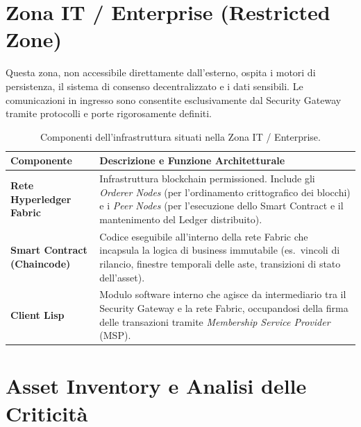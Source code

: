 \newpage

\section{Zona IT / Enterprise (Restricted Zone)}

Questa zona, non accessibile direttamente dall'esterno, ospita i motori di persistenza, il sistema di consenso decentralizzato e i dati sensibili. Le comunicazioni in ingresso sono consentite esclusivamente dal Security Gateway tramite protocolli e porte rigorosamente definiti.

\begin{table}[h]
\centering
\small
\renewcommand{\arraystretch}{1.4}
\begin{tabularx}{\textwidth}{>{\bfseries}p{3.5cm} X}
\toprule
\textbf{Componente} & \textbf{Descrizione e Funzione Architetturale} \\
\midrule
Rete Hyperledger Fabric &
    Infrastruttura blockchain permissioned. Include gli \textit{Orderer Nodes} (per l'ordinamento
    crittografico dei blocchi) e i \textit{Peer Nodes} (per l'esecuzione dello Smart Contract e
    il mantenimento del Ledger distribuito). \\[4pt]
Smart Contract (Chaincode) &
    Codice eseguibile all'interno della rete Fabric che incapsula la logica di business
    immutabile (es.\ vincoli di rilancio, finestre temporali delle aste, transizioni di stato
    dell'asset). \\[4pt]
Client Lisp &
    Modulo software interno che agisce da intermediario tra il Security Gateway e la rete
    Fabric, occupandosi della firma delle transazioni tramite \textit{Membership Service
    Provider} (MSP). \\
\bottomrule
\end{tabularx}
\caption{Componenti dell'infrastruttura situati nella Zona IT / Enterprise.}
\label{tab:it-zone}
\end{table}

\newpage

\section{Asset Inventory e Analisi delle Criticità}

